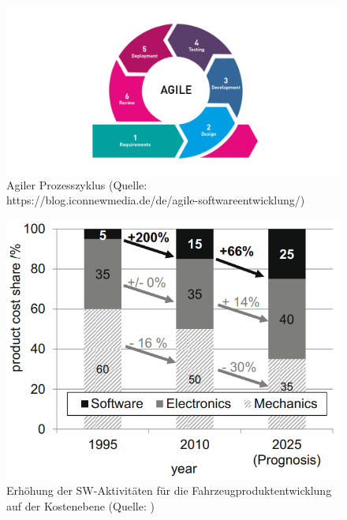 \begin{figure}[htb]
	\centering
	\includegraphics[width=\textwidth]{img/agile_cycle.png}
	\caption[Agiler Prozesszyklus (Quelle: https://blog.iconnewmedia.de/de/agile-softwareentwicklung/)]{Agiler Prozesszyklus (Quelle: https://blog.iconnewmedia.de/de/agile-softwareentwicklung/)}
	\label{fig:agile2}
\end{figure}

\begin{figure}[htb]
	\centering
	\includegraphics[width=\textwidth]{img/sw-activities-costs.png}
	\caption[Erhöhung der SW-Aktivitäten für die Fahrzeugproduktentwicklung auf der Kostenebene (Quelle: \cite{Schlosser2016})]{Erhöhung der SW-Aktivitäten für die Fahrzeugproduktentwicklung auf der Kostenebene (Quelle: \cite{Schlosser2016})}
	\label{fig:swSosts}
\end{figure}